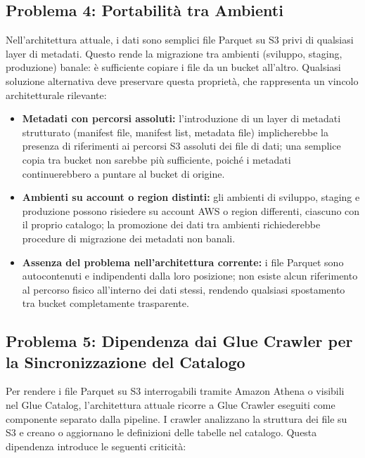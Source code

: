\documentclass[12pt,a4paper,openright,twoside]{book}
\begin{document}
\subsection{Problema 4: Portabilità tra Ambienti}
Nell’architettura attuale, i dati sono semplici file Parquet su S3 privi di qualsiasi layer di metadati. Questo rende la migrazione tra ambienti (sviluppo, staging, produzione) banale: è sufficiente copiare i file da un bucket all’altro. Qualsiasi soluzione alternativa deve preservare questa proprietà, che rappresenta un vincolo architetturale rilevante:

\begin{itemize}
    \item \textbf{Metadati con percorsi assoluti:} l’introduzione di un layer di metadati strutturato (manifest file, manifest list, metadata file) implicherebbe la presenza di riferimenti ai percorsi S3 assoluti dei file di dati; una semplice copia tra bucket non sarebbe più sufficiente, poiché i metadati continuerebbero a puntare al bucket di origine.
    \item \textbf{Ambienti su account o region distinti:} gli ambienti di sviluppo, staging e produzione possono risiedere su account AWS o region differenti, ciascuno con il proprio catalogo; la promozione dei dati tra ambienti richiederebbe procedure di migrazione dei metadati non banali.
    \item \textbf{Assenza del problema nell’architettura corrente:} i file Parquet sono autocontenuti e indipendenti dalla loro posizione; non esiste alcun riferimento al percorso fisico all’interno dei dati stessi, rendendo qualsiasi spostamento tra bucket completamente trasparente.
\end{itemize}

\subsection{Problema 5: Dipendenza dai Glue Crawler per la Sincronizzazione del Catalogo}
Per rendere i file Parquet su S3 interrogabili tramite Amazon Athena o visibili nel Glue Catalog, l’architettura attuale ricorre a Glue Crawler eseguiti come componente separato dalla pipeline. I crawler analizzano la struttura dei file su S3 e creano o aggiornano le definizioni delle tabelle nel catalogo. Questa dipendenza introduce le seguenti criticità:
\end{document}
